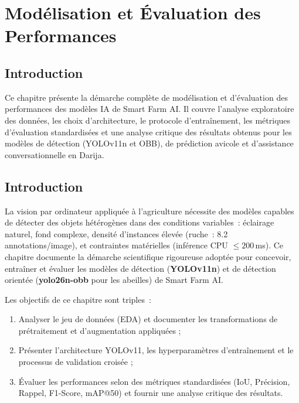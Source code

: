 \chapter{Modélisation et Évaluation des Performances}

\section*{Introduction}
{}

Ce chapitre présente la démarche complète de modélisation et d'évaluation des
performances des modèles IA de Smart Farm AI. Il couvre l'analyse exploratoire
des données, les choix d'architecture, le protocole d'entraînement, les métriques
d'évaluation standardisées et une analyse critique des résultats obtenus pour
les modèles de détection (YOLOv11n et OBB), de prédiction avicole et d'assistance
conversationnelle en Darija.

\section{Introduction}

La vision par ordinateur appliquée à l'agriculture nécessite des modèles capables
de détecter des objets hétérogènes dans des conditions variables~:
éclairage naturel, fond complexe, densité d'instances élevée (ruche~: 8.2 annotations/image),
et contraintes matérielles (inférence CPU $\leq 200$\,ms). Ce chapitre documente
la démarche scientifique rigoureuse adoptée pour concevoir, entraîner et évaluer
les modèles de détection (\textbf{YOLOv11n}) et de détection orientée (\textbf{yolo26n-obb}
pour les abeilles) de Smart Farm AI.

Les objectifs de ce chapitre sont triples~:
\begin{enumerate}
  \item Analyser le jeu de données (EDA) et documenter les transformations de
        prétraitement et d'augmentation appliquées ;
  \item Présenter l'architecture YOLOv11, les hyperparamètres d'entraînement et
        le processus de validation croisée ;
  \item Évaluer les performances selon des métriques standardisées (IoU, Précision,
        Rappel, F1-Score, mAP@50) et fournir une analyse critique des résultats.
\end{enumerate}

